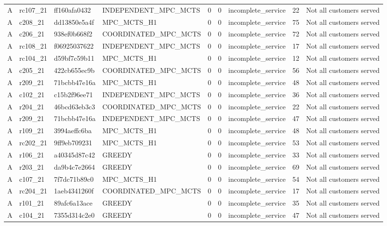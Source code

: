 \begin{table}
{\begin{tabular}{llllrrlrl}
A & rc107\_21 & ff160afa0432 & INDEPENDENT\_MPC\_MCTS & 0 & 0 & incomplete\_service & 22 & Not all customers served \\
A & c208\_21 & dd13850e5a4f & MPC\_MCTS\_H1 & 0 & 0 & incomplete\_service & 75 & Not all customers served \\
A & c206\_21 & 938ef0b668f2 & COORDINATED\_MPC\_MCTS & 0 & 0 & incomplete\_service & 72 & Not all customers served \\
A & rc108\_21 & f06925037622 & INDEPENDENT\_MPC\_MCTS & 0 & 0 & incomplete\_service & 17 & Not all customers served \\
A & rc104\_21 & d59bf7c59b11 & MPC\_MCTS\_H1 & 0 & 0 & incomplete\_service & 12 & Not all customers served \\
A & c205\_21 & 422cb655ec9b & COORDINATED\_MPC\_MCTS & 0 & 0 & incomplete\_service & 56 & Not all customers served \\
A & r209\_21 & 71bcbb47e16a & MPC\_MCTS\_H1 & 0 & 0 & incomplete\_service & 48 & Not all customers served \\
A & c102\_21 & c15b2f96ee71 & INDEPENDENT\_MPC\_MCTS & 0 & 0 & incomplete\_service & 36 & Not all customers served \\
A & r204\_21 & 46bcd63eb3c3 & COORDINATED\_MPC\_MCTS & 0 & 0 & incomplete\_service & 22 & Not all customers served \\
A & r209\_21 & 71bcbb47e16a & INDEPENDENT\_MPC\_MCTS & 0 & 0 & incomplete\_service & 47 & Not all customers served \\
A & r109\_21 & 3994aeffc6ba & MPC\_MCTS\_H1 & 0 & 0 & incomplete\_service & 48 & Not all customers served \\
A & rc202\_21 & 9ff9eb709231 & MPC\_MCTS\_H1 & 0 & 0 & incomplete\_service & 53 & Not all customers served \\
A & r106\_21 & a40345d87c42 & GREEDY & 0 & 0 & incomplete\_service & 33 & Not all customers served \\
A & r203\_21 & da9b4c7e2664 & GREEDY & 0 & 0 & incomplete\_service & 69 & Not all customers served \\
A & c107\_21 & 7f7dc71b89c0 & MPC\_MCTS\_H1 & 0 & 0 & incomplete\_service & 54 & Not all customers served \\
A & rc204\_21 & 1aeb4341260f & COORDINATED\_MPC\_MCTS & 0 & 0 & incomplete\_service & 17 & Not all customers served \\
A & r101\_21 & 89afc6a13ace & GREEDY & 0 & 0 & incomplete\_service & 35 & Not all customers served \\
A & c104\_21 & 7355d314c2e0 & GREEDY & 0 & 0 & incomplete\_service & 47 & Not all customers served \\

\end{tabular}}
\end{table}
